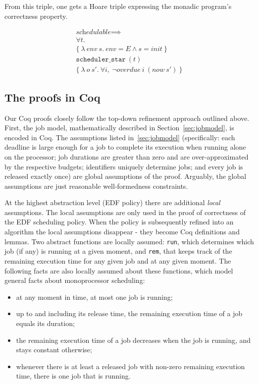 	From this triple, one gets a Hoare triple expressing the monadic program's correctness property.

	\begin{gather*}
		\textit{schedulable} \implies\\
		\forall t.\\
		\{
		~\lambda~\textit{env}~s. ~\textit{env} = E \land s = \textit{init}~
		\}\\
		\texttt{scheduler\_star}~(t)\\
		\{
		~\lambda~o~s'. ~\forall i,~\neg \textit{overdue}~i~(\textit{now}~s') ~
		\}
	\end{gather*}


	\subsection{The proofs in Coq}
	Our Coq proofs closely follow the top-down refinement approach outlined above. First, the job model, mathematically described in Section~\ref{sec:jobmodel}, is encoded in Coq. The assumptions listed in~\ref{sec:jobmodel} (specifically: each deadline is large enough for a job to complete its execution when running alone on the processor; job durations are greater than zero and are over-approximated by the respective budgets; identifiers uniquely determine jobs; and every job is released exactly once) are global assumptions of the proof. Arguably, the global assumptions are just reasonable well-formedness constraints.



	At the highest abstraction level (EDF policy) there are additional \emph{local} assumptions.
	The local assumptions are only used in the proof of correctness of the EDF scheduling policy. When the policy is subsequently
	refined into an algorithm the local assumptions disappear - they become Coq definitions and lemmas.
	Two abstract functions are locally assumed: \texttt{run}, which determines which job (if any) is  running at a given moment, and \texttt{rem}, that keeps track of the remaining execution time for any given job and at any given moment.
	The following facts are also locally assumed about these functions, which model general facts about monoprocessor scheduling:
	
	\begin{itemize}
		\item at any moment in time, at most one job is running;
		\item up to and including its release time, the remaining execution time of a job equals its duration;
		\item the remaining execution time of a job decreases when the job is running, and stays constant otherwise;
		\item whenever there is at least a released job with non-zero remaining execution time, there is one job that is running.
	\end{itemize}

